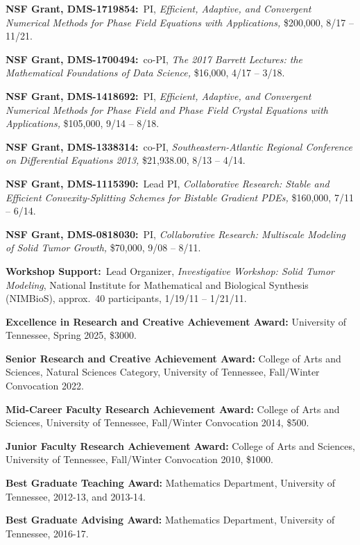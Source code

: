 \documentclass[11pt]{letter}
\begin{document}
\begin{description}
    \item
\textbf{NSF Grant, DMS-1719854:}~PI, {\sl Efficient, Adaptive, and Convergent Numerical Methods for Phase Field Equations with Applications,} \$200,000, 8/17 -- 11/21.


	 \item
\textbf{NSF Grant, DMS-1700494:}~co-PI, {\sl The 2017 Barrett Lectures: the Mathematical Foundations of Data Science,} \$16,000, 4/17 -- 3/18.

    \item
\textbf{NSF Grant, DMS-1418692:}~PI, {\sl Efficient, Adaptive, and Convergent Numerical Methods for Phase Field and Phase Field Crystal Equations with Applications,} \$105,000, 9/14 -- 8/18.

    \item
\textbf{NSF Grant, DMS-1338314:}~co-PI, {\sl Southeastern-Atlantic Regional Conference on Differential Equations 2013,} \$21,938.00, 8/13 -- 4/14.

    \item
\textbf{NSF Grant, DMS-1115390:}~Lead PI, {\sl Collaborative Research: Stable and Efficient Convexity-Splitting Schemes for Bistable Gradient PDEs,} \$160,000, 7/11 -- 6/14.

    \item
\textbf{NSF Grant, DMS-0818030:}~PI, {\sl Collaborative Research: Multiscale Modeling of Solid Tumor Growth,} \$70,000, 9/08 -- 8/11.
	
	\item
\textbf{Workshop Support:}~Lead Organizer, {\sl Investigative Workshop: Solid Tumor Modeling}, National Institute for Mathematical and Biological Synthesis (NIMBioS), approx.~40 participants, 1/19/11 -- 1/21/11.

	\item
\textbf{Excellence in Research and
Creative Achievement Award:} University of Tennessee, Spring 2025,  \$3000.
	
	\item
\textbf{Senior Research and Creative Achievement Award:} College of Arts and Sciences, Natural Sciences Category, University of Tennessee, Fall/Winter Convocation 2022.
	
	\item
\textbf{Mid-Career Faculty Research Achievement Award:} College of Arts and Sciences, University of Tennessee, Fall/Winter Convocation 2014, \$500.
	\item
\textbf{Junior Faculty Research Achievement Award:} College of Arts and Sciences, University of Tennessee, Fall/Winter Convocation 2010, \$1000.
	\item
\textbf{Best Graduate Teaching Award:} Mathematics Department, University of Tennessee, 2012-13, and 2013-14.
	\item
\textbf{Best Graduate Advising Award:} Mathematics Department, University of Tennessee, 2016-17.

    \end{description}
	
\end{document}

